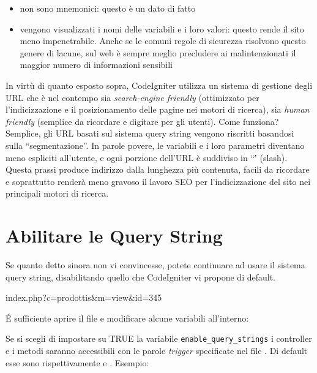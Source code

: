 \begin{itemize}
\item non sono mnemonici: questo è un dato di fatto
\item vengono visualizzati i nomi delle variabili e i loro valori: questo rende il sito meno impenetrabile. Anche se le comuni regole di sicurezza risolvono questo genere di lacune, sul web è sempre meglio precludere ai malintenzionati il maggior numero di informazioni sensibili
\end{itemize}

In virtù di quanto esposto sopra, CodeIgniter utilizza un sistema di gestione degli \ac{URL} che è nel contempo sia \emph{search-engine friendly} (ottimizzato per l'indicizzazione e il posizionamento delle pagine nei motori di ricerca), sia \emph{human friendly} (semplice da ricordare e digitare per gli utenti). Come funziona? Semplice, gli \ac{URL} basati sul sistema query string vengono riscritti basandosi sulla ``segmentazione''. In parole povere, le variabili e i loro parametri diventano meno espliciti all'utente, e ogni porzione dell'\ac{URL} è suddiviso in ``\'' (slash). Questa prassi produce indirizzo dalla lunghezza più contenuta, facili da ricordare e soprattutto renderà meno gravoso il lavoro SEO per l'indicizzazione del sito nei principali motori di ricerca.

\section{Abilitare le Query String}
Se quanto detto sinora non vi convincesse, potete continuare ad usare il sistema query string, disabilitando quello che CodeIgniter vi propone di default.

\begin{codef}
index.php?c=prodottis&m=view&id=345
\end{codef}

\'E sufficiente aprire il file  e modificare alcune variabili all'interno:


Se si scegli di impostare su TRUE la variabile \verb|enable_query_strings| i controller e i metodi saranno accessibili con le parole \textit{trigger} specificate nel file . Di default esse sono rispettivamente  e . Esempio:

